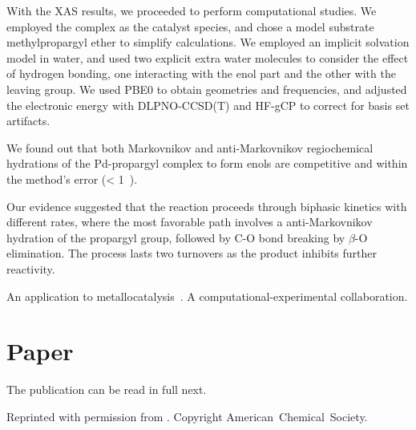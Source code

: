 With the XAS results, we proceeded to perform computational studies.
We employed the  complex as the catalyst species, and chose a
model substrate methylpropargyl ether to simplify calculations.
We employed an implicit solvation model in water, and used two explicit extra
water molecules to consider the effect of hydrogen bonding, one interacting
with the enol part and the other with the leaving group.
We used PBE0 to obtain geometries and frequencies, and adjusted the electronic
energy with DLPNO-CCSD(T) and HF-gCP to correct for basis set artifacts.

We found out that both Markovnikov and anti-Markovnikov regiochemical
hydrations of the Pd-propargyl complex to form enols are competitive and within
the method's error (< 1~\kcalmol).

Our evidence suggested that the reaction proceeds through biphasic kinetics
with different rates, where the most favorable path involves a 
anti-Markovnikov hydration of the propargyl group, followed by C-O bond breaking
by $\beta$-O elimination.
The process lasts two turnovers as the product inhibits further
reactivity.

An application to metallocatalysis~\cite{Coelho_2019}.
A computational-experimental collaboration.




\section{Paper}

The publication can be read in full next.

Reprinted with permission from
.
Copyright
\citeyear{Coelho_2019}
American~Chemical~Society.



